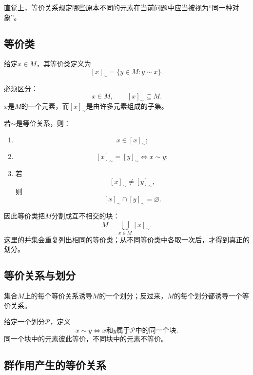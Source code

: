 直觉上，等价关系规定哪些原本不同的元素在当前问题中应当被视为“同一种对象”。

\subsection{等价类}

\begin{definition}[等价类]
给定$x\in M$，其等价类定义为
\[
    [x]_{\sim}
    =
    \{y\in M:y\sim x\}.
\]
\end{definition}

必须区分：
\[
    x\in M,
    \qquad
    [x]_{\sim}\subseteq M.
\]
$x$是$M$的一个元素，而$[x]_{\sim}$是由许多元素组成的子集。

\begin{theorem}[等价类的基本性质]
若$\sim$是等价关系，则：

\begin{enumerate}
    \item
    \[
        x\in[x]_{\sim};
    \]
    \item
    \[
        [x]_{\sim}=[y]_{\sim}
        \Longleftrightarrow
        x\sim y;
    \]
    \item 若
    \[
        [x]_{\sim}\neq[y]_{\sim},
    \]
    则
    \[
        [x]_{\sim}\cap[y]_{\sim}=\varnothing.
    \]
\end{enumerate}
\end{theorem}

因此等价类把$M$分割成互不相交的块：
\[
    M
    =
    \bigcup_{x\in M}[x]_{\sim}.
\]
这里的并集会重复列出相同的等价类；从不同等价类中各取一次后，才得到真正的划分。

\subsection{等价关系与划分}

\begin{theorem}[等价类划分]
集合$M$上的每个等价关系诱导$M$的一个划分；反过来，$M$的每个划分都诱导一个等价关系。
\end{theorem}

给定一个划分$\mathcal P$，定义
\[
    x\sim y
    \Longleftrightarrow
    \text{$x$和$y$属于$\mathcal P$中的同一个块}.
\]
同一个块中的元素彼此等价，不同块中的元素不等价。

\subsection{群作用产生的等价关系}

